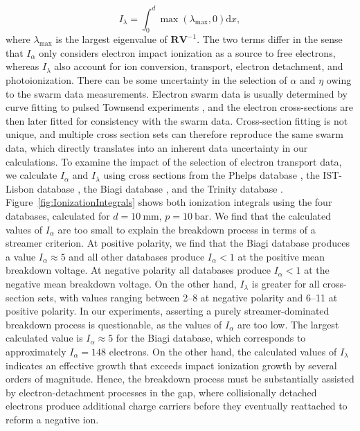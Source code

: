 \documentclass{iopjournal}
\newcommand{\diff}{\ensuremath{\text{d}}}
\begin{document}
\begin{equation}
  \label{eq:apparent_ionization_integral}
  I_\lambda = \int_0^d\max\left(\lambda_{\text{max}},0\right)\diff x,
\end{equation}
where $\lambda_{\text{max}}$ is the largest eigenvalue of $\bm{R}\bm{V}^{-1}$.
The two terms differ in the sense that $I_{\alpha}$ only considers electron impact ionization as a source to free electrons, whereas $I_\lambda$ also account for ion conversion, transport, electron detachment, and photoionization.
There can be some uncertainty in the selection of $\alpha$ and $\eta$ owing to the swarm data measurements.
Electron swarm data is usually determined by curve fitting to pulsed Townsend experiments \cite{Vemulapalli2025}, and the electron cross-sections are then later fitted for consistency with the swarm data.
Cross-section fitting is not unique, and multiple cross section sets can therefore reproduce the same swarm data, which directly translates into an inherent data uncertainty in our calculations.
To examine the impact of the selection of electron transport data, we calculate $I_\alpha$ and $I_\lambda$ using cross sections from the Phelps database \cite{phelps}, the IST-Lisbon database \cite{lisbon}, the Biagi database \cite{biagi}, and the Trinity database \cite{trinity}.
Figure~\ref{fig:IonizationIntegrals} shows both ionization integrals using the four databases, calculated for $d = \SI{10}{\milli\meter}$, $p=\SI{10}{\bar}$.
We find that the calculated values of $I_\alpha$ are too small to explain the breakdown process in terms of a streamer criterion.
At positive polarity, we find that the Biagi database produces a value $I_\alpha\approx 5$ and all other databases produce $I_\alpha< 1$ at the positive mean breakdown voltage.
At negative polarity all databases produce $I_\alpha < 1$ at the negative mean breakdown voltage.
On the other hand, $I_\lambda$ is greater for all cross-section sets, with values ranging between \numrange{2}{8} at negative polarity and \numrange{6}{11} at positive polarity.
In our experiments, asserting a purely streamer-dominated breakdown process is questionable, as the values of $I_\alpha$ are too low.
The largest calculated value is $I_\alpha\approx 5$ for the Biagi database, which corresponds to approximately $I_\alpha = \num{148}$ electrons.
On the other hand, the calculated values of $I_\lambda$ indicates an effective growth that exceeds impact ionization growth by several orders of magnitude.
Hence, the breakdown process must be substantially assisted by electron-detachment processes in the gap, where collisionally detached electrons produce additional charge carriers before they eventually reattached to reform a negative ion.
\end{document}
